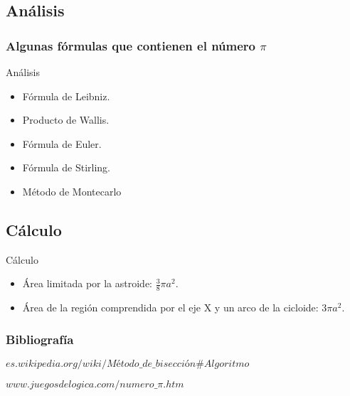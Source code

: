 \documentclass{beamer}
\begin{document}
\subsection{Análisis}
\begin{frame}
\frametitle{Algunas fórmulas que contienen el número $\pi$}
\begin{block}{Análisis}
\begin{itemize}
  \item Fórmula de Leibniz.
  \pause
  \item Producto de Wallis.
  \pause
  \item Fórmula de Euler.
  \pause
  \item Fórmula de Stirling.
  \pause
  \item Método de Montecarlo

\end{itemize}
\end{block}

\end{frame}

\subsection{Cálculo} 
\begin{frame}

\begin{block}{Cálculo}
\begin{itemize}
  \item Área limitada por la astroide: $\frac{3}{8}\pi a^2 $.
  \pause

  \item Área de la región comprendida por el eje X y un arco de la cicloide: $3 \pi a^2.$

\end{itemize}
\end{block}

\end{frame}

\begin{frame}
\frametitle{Bibliografía}
\begin{thebibliography}
  \beamertermplatebookbibitems
  {\small $es.wikipedia.org/wiki/Método\_de\_bisección\#Algoritmo$}
  
  \beamertermplatebookbibitems
  {\small $www.juegosdelogica.com/numero\_\pi.htm$}
  
\end{thebibliography}
\end{frame}
\end{document}
